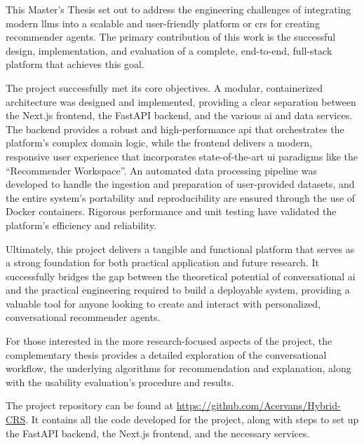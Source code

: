 This Master's Thesis set out to address the engineering challenges of integrating modern \acp{llm} into a scalable and user-friendly platform or \acl{crs} for creating recommender agents. The primary contribution of this work is the successful design, implementation, and evaluation of a complete, end-to-end, full-stack platform that achieves this goal.

The project successfully met its core objectives. A modular, containerized architecture was designed and implemented, providing a clear separation between the Next.js frontend, the FastAPI backend, and the various \acs{ai} and data services. The backend provides a robust and high-performance \ac{api} that orchestrates the platform's complex domain logic, while the frontend delivers a modern, responsive user experience that incorporates state-of-the-art \acs{ui} paradigms like the ``Recommender Workspace''. An automated data processing pipeline was developed to handle the ingestion and preparation of user-provided datasets, and the entire system's portability and reproducibility are ensured through the use of Docker containers. Rigorous performance and unit testing have validated the platform's efficiency and reliability.

Ultimately, this project delivers a tangible and functional platform that serves as a strong foundation for both practical application and future research. It successfully bridges the gap between the theoretical potential of conversational \acs{ai} and the practical engineering required to build a deployable system, providing a valuable tool for anyone looking to create and interact with personalized, conversational recommender agents. 

For those interested in the more research-focused aspects of the project, the complementary thesis \cite{MUI2ICSI_THESIS} provides a detailed exploration of the conversational workflow, the underlying algorithms for recommendation and explanation, along with the usability evaluation's procedure and results.

The project repository can be found at \url{https://github.com/Acervans/Hybrid-CRS}. It contains all the code developed for the project, along with steps to set up the FastAPI backend, the Next.js frontend, and the necessary services.